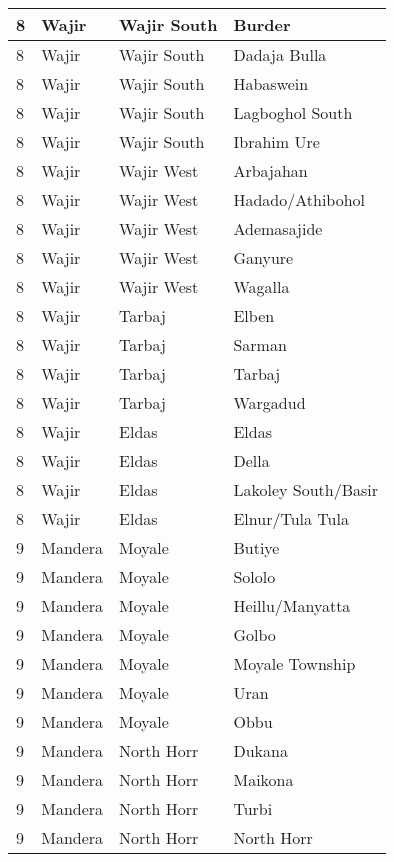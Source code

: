 \begin{table}[!ht]
\begin{tabular}{|l|l|l|l|}
        8 & Wajir & Wajir South & Burder \\ \hline
        8 & Wajir & Wajir South & Dadaja Bulla \\ \hline
        8 & Wajir & Wajir South & Habaswein \\ \hline
        8 & Wajir & Wajir South & Lagboghol South \\ \hline
        8 & Wajir & Wajir South & Ibrahim Ure \\ \hline
        8 & Wajir & Wajir West & Arbajahan \\ \hline
        8 & Wajir & Wajir West & Hadado/Athibohol \\ \hline
        8 & Wajir & Wajir West & Ademasajide \\ \hline
        8 & Wajir & Wajir West & Ganyure \\ \hline
        8 & Wajir & Wajir West & Wagalla \\ \hline
        8 & Wajir & Tarbaj & Elben \\ \hline
        8 & Wajir & Tarbaj & Sarman \\ \hline
        8 & Wajir & Tarbaj & Tarbaj \\ \hline
        8 & Wajir & Tarbaj & Wargadud \\ \hline
        8 & Wajir & Eldas & Eldas \\ \hline
        8 & Wajir & Eldas & Della \\ \hline
        8 & Wajir & Eldas & Lakoley South/Basir \\ \hline
        8 & Wajir & Eldas & Elnur/Tula Tula \\ \hline
        9 & Mandera & Moyale & Butiye \\ \hline
        9 & Mandera & Moyale & Sololo \\ \hline
        9 & Mandera & Moyale & Heillu/Manyatta \\ \hline
        9 & Mandera & Moyale & Golbo \\ \hline
        9 & Mandera & Moyale & Moyale Township \\ \hline
        9 & Mandera & Moyale & Uran \\ \hline
        9 & Mandera & Moyale & Obbu \\ \hline
        9 & Mandera & North Horr & Dukana \\ \hline
        9 & Mandera & North Horr & Maikona \\ \hline
        9 & Mandera & North Horr & Turbi \\ \hline
        9 & Mandera & North Horr & North Horr \\ \hline

\end{tabular}
\end{table}
